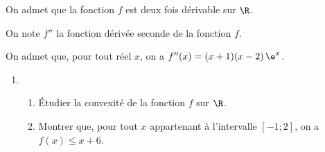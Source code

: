 On admet que la fonction $f$ est deux fois dérivable sur $\R$.

On note $f''$ la fonction dérivée seconde de la fonction $f$.

On admet que, pour tout réel $x$, on a \mbox{$f''(x) = (x + 1)(x- 2)\,\e^x$}.

\begin{enumerate}[resume]
	\item 
	\begin{enumerate}
		\item Étudier la convexité de la fonction $f$ sur $\R$.
		\item Montrer que, pour tout $x$ appartenant à l'intervalle $[-1;2]$, on a $f(x) \leqslant x + 6$.
	\end{enumerate}
\end{enumerate}